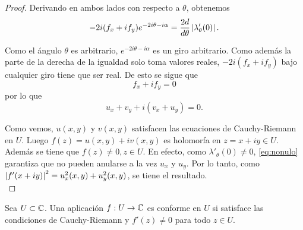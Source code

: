 \begin{proof}
    Derivando en ambos lados con respecto a $\theta$, obtenemos
    \begin{equation*}
        -2i (f_x + i f_y) e^{-2i \theta - i \alpha} = \frac{2d}{d \theta} \left\lvert\lambda_{\theta}'(0)\right\rvert.
    \end{equation*}


    Como el ángulo $\theta$ es arbitrario, $e^{-2i \theta - i \alpha}$ es un giro arbitrario. Como además la parte de la derecha de la igualdad solo toma valores reales, $-2i(f_x + i f_y)$ bajo cualquier giro tiene que ser real. De esto se sigue que
       \begin{equation*}
        f_x + i f_y = 0
    \end{equation*}
    por lo que
    \begin{equation*}
        u_x + v_y + i(v_x + u_y) = 0.
    \end{equation*}

    Como vemos, $u(x,y)$ y $v(x,y)$ satisfacen las ecuaciones de Cauchy-Riemann en $U$. Luego $f(z) = u(x,y) + i v(x,y)$ es holomorfa en $z = x + iy \in U$. Además se tiene que $f(z) \not = 0, z \in U$. En efecto, como $\lambda'_\theta(0) \neq 0$, \eqref{eq:nonulo} garantiza que no pueden anularse a la vez $u_x$ y $u_y$. Por lo tanto, como $\left\lvert f'(x+iy)\right\rvert^2 = u_x^2(x,y)+u_y^2(x,y)$, se tiene el resultado. \\
\end{proof}

\begin{prop}
    Sea $U \subset \mathbb{C}$. Una aplicación $f: U \to \mathbb{C}$ es conforme en $U$ si satisface las condiciones de Cauchy-Riemann y $f'(z) \not = 0$ para todo $z \in U$.
\end{prop}

